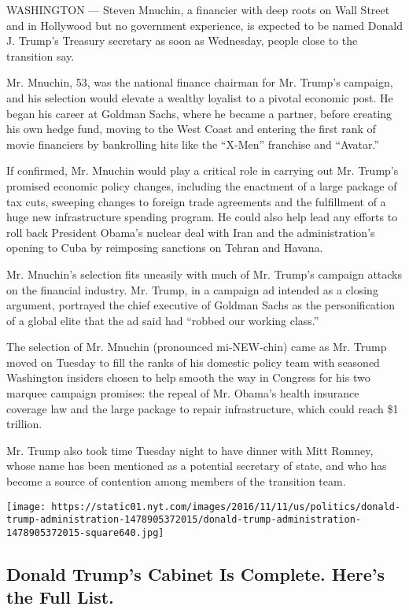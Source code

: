 WASHINGTON --- Steven Mnuchin, a financier with deep roots on Wall
Street and in Hollywood but no government experience, is expected to be
named Donald J. Trump's Treasury secretary as soon as Wednesday, people
close to the transition say.

Mr. Mnuchin, 53, was the national finance chairman for Mr. Trump's
campaign, and his selection would elevate a wealthy loyalist to a
pivotal economic post. He began his career at Goldman Sachs, where he
became a partner, before creating his own hedge fund, moving to the West
Coast and entering the first rank of movie financiers by bankrolling
hits like the ``X-Men'' franchise and ``Avatar.''

If confirmed, Mr. Mnuchin would play a critical role in carrying out Mr.
Trump's promised economic policy changes, including the enactment of a
large package of tax cuts, sweeping changes to foreign trade agreements
and the fulfillment of a huge new infrastructure spending program. He
could also help lead any efforts to roll back President Obama's nuclear
deal with Iran and the administration's opening to Cuba by reimposing
sanctions on Tehran and Havana.

Mr. Mnuchin's selection fits uneasily with much of Mr. Trump's campaign
attacks on the financial industry. Mr. Trump, in a campaign ad intended
as a closing argument, portrayed the chief executive of Goldman Sachs as
the personification of a global elite that the ad said had ``robbed our
working class.''

The selection of Mr. Mnuchin (pronounced mi-NEW-chin) came as Mr. Trump
moved on Tuesday to fill the ranks of his domestic policy team with
seasoned Washington insiders chosen to help smooth the way in Congress
for his two marquee campaign promises: the repeal of Mr. Obama's health
insurance coverage law and the large package to repair infrastructure,
which could reach \$1 trillion.

Mr. Trump also took time Tuesday night to have dinner with Mitt Romney,
whose name has been mentioned as a potential secretary of state, and who
has become a source of contention among members of the transition team.

\href{https://www.nytimes.com/interactive/2016/us/politics/donald-trump-administration.html}{}

\texttt{[image: https://static01.nyt.com/images/2016/11/11/us/politics/donald-trump-administration-1478905372015/donald-trump-administration-1478905372015-square640.jpg]}

\hypertarget{donald-trumps-cabinet-is-complete-heres-the-full-list}{%
\subsection{Donald Trump's Cabinet Is Complete. Here's the Full
List.}\label{donald-trumps-cabinet-is-complete-heres-the-full-list}}

